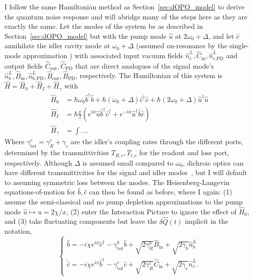 I follow the same Hamiltonian method as Section~\ref{sec:dOPO_model} to derive the quantum noise response and will abridge many of the steps here as they are exactly the same. Let the modes of the system be as described in Section~\ref{sec:dOPO_model} but with the pump mode $\hat u$ at $2\omega_0+\Delta$, and let $\hat c$ annihilate the idler cavity mode at $\omega_0+\Delta$ (assumed on-resonance by the single-mode approximation ) with associated input vacuum fields $\hat n^L_c, \hat C_\text{in}, \hat n^L_\text{c,PD}$ and output fields $\hat C_\text{out}, \hat C_\text{PD}$ that are direct analogues of the signal mode's $\hat n^L_b, \hat B_\text{in}, \hat n^L_\text{b,PD}, \hat B_\text{out}, \hat B_\text{PD}$, respectively. The Hamiltonian of this system is $\hat H = \hat H_0+\hat H_I+\hat H_\gamma$ with 
\begin{align}
\hat H_0 &= \hbar \omega_0 \hat b^\dag \hat b + \hbar (\omega_0+\Delta) \hat c^\dag \hat c + \hbar (2\omega_0+\Delta) \hat u^\dag \hat u\\
\hat H_I &= \hbar \frac{x}{2} \left(e^{i\phi} \hat u \hat b^\dag \hat c^\dag + e^{-i\phi} \hat u^\dag \hat b \hat c \right)\\
\hat H_\gamma &= \int \ldots .
\end{align}
Where $\gamma^c_\text{tot}=\gamma^c_R+\gamma_c$ are the idler's coupling rates through the different ports, determined by the transmittivities $T_{R,c}, T_{l,c}$ for the readout and loss port, respectively. Although $\Delta$ is assumed small compared to $\omega_0$, dichroic optics can have different transmittivities for the signal and idler modes~\cite{}, but I will default to assuming symmetric loss between the modes. The Heisenberg-Langevin equations-of-motion for $\hat b, \hat c$ can then be found as before, where I again: (1) assume the semi-classical and no pump depletion approximations to the pump mode $\hat u\mapsto u=2\chi/x$, (2) enter the Interaction Picture to ignore the effect of $\hat H_0$, and (3) take fluctuating components but leave the $\delta \hat Q(t)$ implicit in the notation,
\begin{equation}\begin{cases}\label{eq:nOPO_EoM}
\dot{\hat{b}}=-i\chi e^{i\phi}\hat{c}^\dagger - \gamma^b_\mathrm{tot} \hat{b} + \sqrt{2\gamma^b_R}\hat{B}_\mathrm{in} + \sqrt{2\gamma_b}\hat{n}^L_b\\
\dot{\hat{c}}=-i\chi e^{i\phi}\hat{b}^\dagger - \gamma^c_\mathrm{tot} \hat{c} + \sqrt{2\gamma^c_R}\hat{C}_\mathrm{in} + \sqrt{2\gamma_c}\hat{n}^L_c.
\end{cases}\end{equation}
